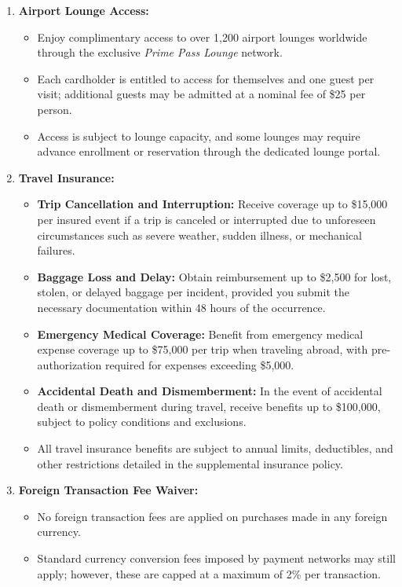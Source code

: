 \documentclass[12pt,a4paper]{article}
\begin{document}
\begin{enumerate}[label=\arabic*.]
    \item \textbf{Airport Lounge Access:}
    \begin{itemize}
        \item Enjoy complimentary access to over 1,200 airport lounges worldwide through the exclusive \textit{Prime Pass Lounge} network.
        \item Each cardholder is entitled to access for themselves and one guest per visit; additional guests may be admitted at a nominal fee of \$25 per person.
        \item Access is subject to lounge capacity, and some lounges may require advance enrollment or reservation through the dedicated lounge portal.
    \end{itemize}
    \item \textbf{Travel Insurance:}
    \begin{itemize}
        \item \textbf{Trip Cancellation and Interruption:} Receive coverage up to \$15,000 per insured event if a trip is canceled or interrupted due to unforeseen circumstances such as severe weather, sudden illness, or mechanical failures.
        \item \textbf{Baggage Loss and Delay:} Obtain reimbursement up to \$2,500 for lost, stolen, or delayed baggage per incident, provided you submit the necessary documentation within 48 hours of the occurrence.
        \item \textbf{Emergency Medical Coverage:} Benefit from emergency medical expense coverage up to \$75,000 per trip when traveling abroad, with pre-authorization required for expenses exceeding \$5,000.
        \item \textbf{Accidental Death and Dismemberment:} In the event of accidental death or dismemberment during travel, receive benefits up to \$100,000, subject to policy conditions and exclusions.
        \item All travel insurance benefits are subject to annual limits, deductibles, and other restrictions detailed in the supplemental insurance policy.
    \end{itemize}
    \item \textbf{Foreign Transaction Fee Waiver:}
    \begin{itemize}
        \item No foreign transaction fees are applied on purchases made in any foreign currency.
        \item Standard currency conversion fees imposed by payment networks may still apply; however, these are capped at a maximum of 2\% per transaction.

\end{itemize}
\end{enumerate}
\end{document}
